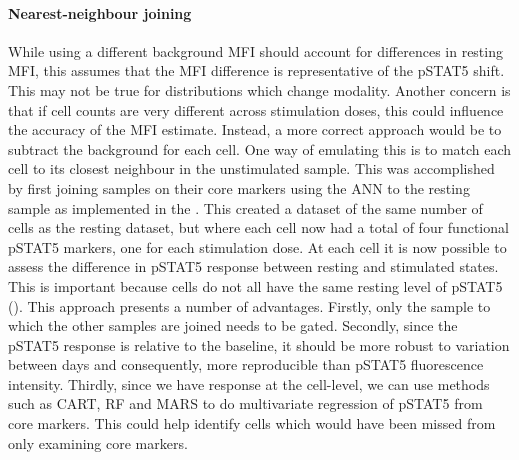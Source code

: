 \paragraph{Nearest-neighbour joining}
While using a different background MFI should account for differences in resting MFI,
this assumes that the MFI difference is representative of the pSTAT5 shift.
This may not be true for distributions which change modality.
Another concern is that if cell counts are very different across stimulation doses, this could influence the accuracy of the MFI estimate.
Instead, a more correct approach would be to subtract the background for each cell.
One way of emulating this is to match each cell to its closest neighbour in the unstimulated sample.  
This was accomplished by first joining samples on their core markers using the \gls{ANN} to the resting sample \citep{Jones:2011ez}
as implemented in the .
This created a dataset of the same number of cells as the resting dataset, but where each cell now had a total of four functional pSTAT5 markers,
one for each stimulation dose.
At each cell it is now possible to assess the difference in pSTAT5 response between resting and stimulated states.
This is important because cells do not all have the same resting level of pSTAT5 ().
This approach presents a number of advantages.
Firstly, only the sample to which the other samples are joined needs to be gated.
Secondly, since the pSTAT5 response is relative to the baseline, it should be more robust to variation between days
and consequently, more reproducible than pSTAT5 fluorescence intensity.
Thirdly, since we have response at the cell-level, we can use methods
such as \gls{CART}, \gls{RF} and \gls{MARS} to do multivariate regression of pSTAT5 from core markers.
This could help identify cells which would have been missed from only examining core markers.
